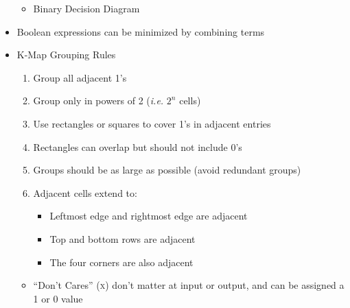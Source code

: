 \begin{itemize}
\begin{itemize}
      \item Binary Decision Diagram

    \end{itemize}

  \item Boolean expressions can be minimized by combining terms

  \item K-Map Grouping Rules

    \begin{enumerate}

      \item Group all adjacent 1's

      \item Group only in powers of 2 (\textit{i.e.} $2^n$ cells)

      \item Use rectangles or squares to cover 1's in adjacent entries

      \item Rectangles can overlap but should not include 0's

      \item Groups should be as large as possible (avoid redundant groups)

      \item Adjacent cells extend to:

        \begin{itemize}

          \item Leftmost edge and rightmost edge are adjacent

          \item Top and bottom rows are adjacent

          \item The four corners are also adjacent

        \end{itemize}

    \end{enumerate}

    \begin{itemize}

      \item ``Don't Cares'' (\textsc{x}) don't matter at input or output, and can be assigned a 1 or 0 value

    \end{itemize}

\end{itemize}



